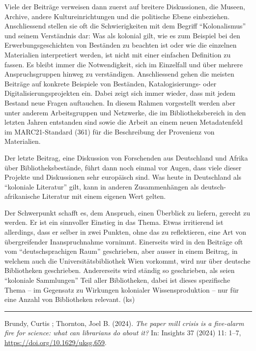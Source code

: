 \documentclass[a4paper,
fontsize=11pt,
oneside,
numbers=noperiodatend,
parskip=half-,
bibliography=totoc,
final
]{scrartcl}
\begin{document}
Viele der Beiträge verweisen dann zuerst auf breitere Diskussionen, die
Museen, Archive, andere Kultureinrichtungen und die politische Ebene
einbeziehen. Anschliessend stellen sie oft die Schwierigkeiten mit dem
Begriff ``Kolonalismus'' und seinem Verständnis dar: Was als kolonial
gilt, wie es zum Beispiel bei den Erwerbungsgeschichten von Beständen zu
beachten ist oder wie die einzelnen Materialien interpretiert werden,
ist nicht mit einer einfachen Definition zu fassen. Es bleibt immer die
Notwendigkeit, sich im Einzelfall und über mehrere Anspruchsgruppen
hinweg zu verständigen. Anschliessend gehen die meisten Beiträge auf
konkrete Beispiele von Beständen, Katalogisierungs- oder
Digitalisierungsprojekten ein. Dabei zeigt sich immer wieder, dass mit
jedem Bestand neue Fragen auftauchen. In diesem Rahmen vorgestellt
werden aber unter anderem Arbeitsgruppen und Netzwerke, die im
Bibliotheksbereich in den letzten Jahren entstanden sind sowie die
Arbeit an einem neuen Metadatenfeld im MARC21-Standard (361) für die
Beschreibung der Provenienz von Materialien.

Der letzte Beitrag, eine Diskussion von Forschenden aus Deutschland und
Afrika über Bibliotheksbestände, führt dann noch einmal vor Augen, dass
viele dieser Projekte und Diskussionen sehr europäisch sind. Was heute
in Deutschland als ``koloniale Literatur'' gilt, kann in anderen
Zusammenhängen als deutsch-afrikanische Literatur mit einem eigenen Wert
gelten.

Der Schwerpunkt schafft es, dem Anspruch, einen Überblick zu liefern,
gerecht zu werden. Er ist ein sinnvoller Einstieg in das Thema. Etwas
irritierend ist allerdings, dass er selber in zwei Punkten, ohne das zu
reflektieren, eine Art von übergreifender Inanspruchnahme vornimmt.
Einerseits wird in den Beiträge oft vom ``deutschsprachigen Raum''
geschrieben, aber ausser in einem Beitrag, in welchem auch die
Universitätsbibliothek Wien vorkommt, wird nur über deutsche
Bibliotheken geschrieben. Andererseits wird ständig so geschrieben, als
seien ``koloniale Sammlungen'' Teil aller Bibliotheken, dabei ist dieses
spezifische Thema -- im Gegensatz zu Wirkungen kolonialer
Wissensproduktion -- nur für eine Anzahl von Bibliotheken relevant. (ks)

\begin{center}\rule{0.5\linewidth}{0.5pt}\end{center}

Brundy, Curtis ; Thornton, Joel B. (2024). \emph{The paper mill crisis
is a five-alarm fire for science: what can librarians do about it?} In:
Insights 37 (2024) 11: 1--7, \url{https://doi.org/10.1629/uksg.659}.
\end{document}

